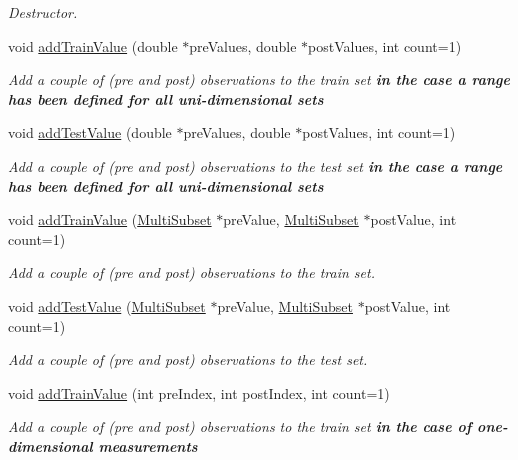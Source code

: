 \begin{DoxyCompactItemize}
\begin{DoxyCompactList}\small\item\em Destructor. \end{DoxyCompactList}\item 
void \hyperlink{classPredictionDataset_adb6c93538580ea8ce7b482fc8bc6f6b7}{add\-Train\-Value} (double $\ast$pre\-Values, double $\ast$post\-Values, int count=1)
\begin{DoxyCompactList}\small\item\em Add a couple of (pre and post) observations to the train set {\bfseries in the case a range has been defined for all uni-\/dimensional sets} \end{DoxyCompactList}\item 
void \hyperlink{classPredictionDataset_ad9e633c08b0ab2af46248c6a66bf00ba}{add\-Test\-Value} (double $\ast$pre\-Values, double $\ast$post\-Values, int count=1)
\begin{DoxyCompactList}\small\item\em Add a couple of (pre and post) observations to the test set {\bfseries in the case a range has been defined for all uni-\/dimensional sets} \end{DoxyCompactList}\item 
void \hyperlink{classPredictionDataset_ae2d6c192122c2f9f7a1b3232b486d86c}{add\-Train\-Value} (\hyperlink{classMultiSubset}{Multi\-Subset} $\ast$pre\-Value, \hyperlink{classMultiSubset}{Multi\-Subset} $\ast$post\-Value, int count=1)
\begin{DoxyCompactList}\small\item\em Add a couple of (pre and post) observations to the train set. \end{DoxyCompactList}\item 
void \hyperlink{classPredictionDataset_a097fc45e897544af6b5215a26fa41527}{add\-Test\-Value} (\hyperlink{classMultiSubset}{Multi\-Subset} $\ast$pre\-Value, \hyperlink{classMultiSubset}{Multi\-Subset} $\ast$post\-Value, int count=1)
\begin{DoxyCompactList}\small\item\em Add a couple of (pre and post) observations to the test set. \end{DoxyCompactList}\item 
void \hyperlink{classPredictionDataset_a9615dd7ab9f8dd04fb2fb28d68bd96b1}{add\-Train\-Value} (int pre\-Index, int post\-Index, int count=1)
\begin{DoxyCompactList}\small\item\em Add a couple of (pre and post) observations to the train set {\bfseries in the case of one-\/dimensional measurements} \end{DoxyCompactList}\item 

\end{DoxyCompactItemize}
